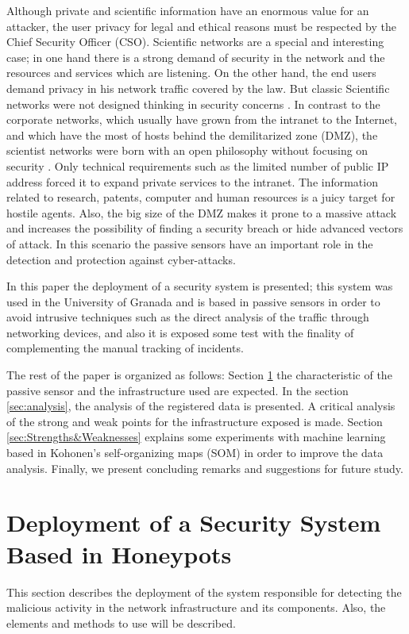 \documentclass[a4paper]{llncs}
\begin{document}
Although private and scientific information have an enormous value for
an attacker, the user privacy for legal and ethical reasons must be
respected by the Chief Security Officer (CSO). Scientific networks are
a special and interesting case; in one hand there is a strong demand
of security in the network and the resources and services which are
listening. On the other hand, the end users demand privacy in his
network traffic covered by the law. But classic Scientific networks
were not designed thinking in security concerns
\cite{iris-proyecto}. In contrast to the corporate networks, which
usually have grown from the intranet to the Internet, and which have
the most of hosts behind the demilitarized zone (DMZ), the scientist
networks were born with an open philosophy without focusing on
security \cite{iris-proyecto}. Only technical requirements such as the
limited number of public IP address forced it to expand private
services to the intranet. The information related to research,
patents, computer and human resources is a juicy target for hostile
agents. Also, the big size of the DMZ makes it prone to a massive
attack and increases the possibility of finding a security breach or
hide advanced vectors of attack. In this scenario the passive sensors
have an important role in the detection and protection against
cyber-attacks. 

In this paper the deployment of a security system is presented; this
system was used in the
University of Granada and is based in passive sensors in order to avoid
intrusive techniques such as the direct analysis of the traffic
through networking devices, and also it is exposed some test with the
finality of complementing the manual tracking of incidents. 

The rest of the paper is organized as follows: Section
\ref{sec:deployment} the characteristic of the passive sensor and the
infrastructure used are expected. In the section \ref{sec:analysis},
the analysis of the registered data is presented. A critical analysis
of the strong and weak points for the infrastructure exposed is
made. Section \ref{sec:Strengths&Weaknesses} explains some experiments
with machine learning based in Kohonen's self-organizing maps (SOM)
\cite{kohonen-1990} in order to improve the data analysis. Finally, we
present concluding remarks and suggestions for future study. 


\section{Deployment of a Security System Based in Honeypots}
\label{sec:deployment}
This section describes the deployment of the system responsible for
detecting the malicious activity in the network infrastructure and its
components. Also, the elements and methods to use will be described. 
\end{document}
